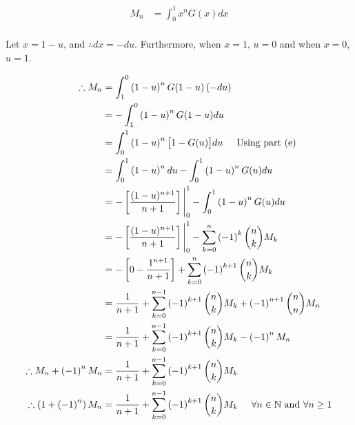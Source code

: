 \documentclass[a4paper]{article}
\begin{document}
\begin{enumerate}[label=\textbf{\arabic*.}]
\begin{enumerate}
		\begin{align*}
		M_n & = \int_{0}^{1}x^{n}G(x)dx\\
		\end{align*}

		Let $x = 1 - u$, and $\therefore dx = -du$. Furthermore, when $x = 1$, $u = 0$ and when $x = 0$, $u = 1$.

		\begin{align*}
		\therefore M_n & = \int_{1}^{0}\left(1-u\right)^{n}G(1-u)\left(-du\right)\\
		& = -\int_{1}^{0}\left(1-u\right)^{n}G(1-u)du\\
		& = \int_{0}^{1}\left(1-u\right)^{n}\big[1-G(u)\big]du \hspace{5mm} \text{Using part (e)}\\
		& = \int_{0}^{1}\left(1-u\right)^{n}du - \int_{0}^{1}\left(1-u\right)^{n}G(u)du\\
		& = -\left[\frac{(1-u)^{n+1}}{n+1}\right]\Bigg{|}_{0}^{1} - \int_{0}^{1}\left(1-u\right)^{n}G(u)du\\
		& = -\left[\frac{(1-u)^{n+1}}{n+1}\right]\Bigg{|}_{0}^{1} - \sum_{k=0}^{n}\left(-1\right)^{k}\binom{n}{k}M_k\\
		& = -\left[0 - \frac{1^{n+1}}{n+1}\right] + \sum_{k=0}^{n}\left(-1\right)^{k+1}\binom{n}{k}M_k\\
		& = \frac{1}{n+1} + \sum_{k=0}^{n-1}\left(-1\right)^{k+1}\binom{n}{k}M_k + \left(-1\right)^{n + 1}\binom{n}{n}M_n\\
		& = \frac{1}{n+1} + \sum_{k=0}^{n-1}\left(-1\right)^{k+1}\binom{n}{k}M_k - \left(-1\right)^{n}M_n\\
		\therefore M_n + \left(-1\right)^{n}M_n & = \frac{1}{n+1} + \sum_{k=0}^{n-1}\left(-1\right)^{k+1}\binom{n}{k}M_k\\
		\therefore \left(1 + \left(-1\right)^{n}\right)M_n & = \frac{1}{n+1} + \sum_{k=0}^{n-1}\left(-1\right)^{k+1}\binom{n}{k}M_k \hspace{5mm} \forall n \in \mathbb{N} \text{ and } \forall n \geq 1\\
		\end{align*}


	\end{enumerate}

\end{enumerate}
\end{document}
